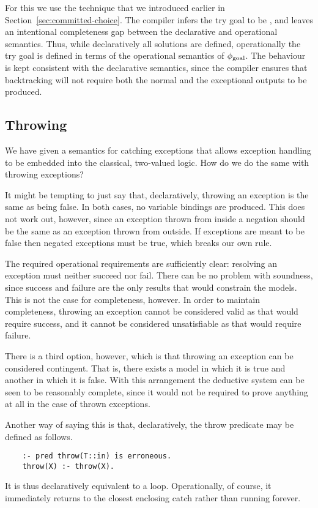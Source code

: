 For this we use the technique
that we introduced earlier in Section~\ref{sec:committed-choice}.
The compiler infers the try goal to be ,
and leaves an intentional completeness gap
between the declarative and operational semantics.
Thus,
while declaratively all solutions are defined,
operationally the try goal
is defined in terms of the operational semantics of $\phi_{\operatorname{goal}}$.
The behaviour is kept consistent with the declarative semantics,
since the compiler ensures that
backtracking will not require
both the normal and the exceptional outputs
to be produced.


\subsection{Throwing}
\label{sec:throw}

We have given a semantics for catching exceptions
that allows exception handling to be embedded
into the classical, two-valued logic.
How do we do the same with throwing exceptions?

It might be tempting to just say that, declaratively,
throwing an exception is the same as being false.
In both cases, no variable bindings are produced.
This does not work out, however,
since an exception thrown from inside a negation
should be the same as an exception thrown from outside.
If exceptions are meant to be false
then negated exceptions must be true,
which breaks our own rule.

The required operational requirements are sufficiently clear:
resolving an exception must neither succeed nor fail.
There can be no problem with soundness,
since success and failure are
the only results that would constrain the models.
This is not the case for completeness, however.
In order to maintain completeness,
throwing an exception cannot be considered valid
as that would require success,
and it cannot be considered unsatisfiable
as that would require failure.

There is a third option, however,
which is that throwing an exception
can be considered contingent\label{gi:contingent2}.
That is, there exists a model in which it is true
and another in which it is false.
With this arrangement
the deductive system can be seen to be reasonably complete,
since it would not be required to
prove anything at all in the case of thrown exceptions.

Another way of saying this is that, declaratively,
the throw predicate may be defined as follows.
\begin{verbatim}
    :- pred throw(T::in) is erroneous.
    throw(X) :- throw(X).
\end{verbatim}
It is thus declaratively equivalent to a loop.
Operationally, of course,
it immediately returns to the closest enclosing catch
rather than running forever.

